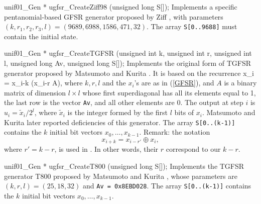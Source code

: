 unif01_Gen * ugfsr_CreateZiff98 (unsigned long S[]);
\endcode
  \tab Implements a specific pentanomial-based GFSR generator proposed 
%
  by Ziff \cite{rZIF98a}, with parameters $(k, r_1, r_2, r_3, l) =
  (9689, 6988, 1586, 471, 32)$.
  The array {\tt S[0..9688]} must contain the initial state.
  \endtab


\code

unif01_Gen * ugfsr_CreateTGFSR (unsigned int k, unsigned int r,
                                unsigned int l, unsigned long Av,
                                unsigned long S[]);
\endcode
  \tab Implements the original form of TGFSR generator proposed by
   Matsumoto and Kurita \cite{rMAT92a}.  It is based on the recurrence
   \eq
      x_i = x_{i-k} \oplus (x_{i-r} A),
   \endeq
   where $k, r, l$ and the $x_i$'s are as in (\ref{GFSR}),
   and $A$ is a binary matrix of dimension $l \times l$ whose first
   superdiagonal has all its elements equal to 1, the last
   row is the vector {\tt Av}, and all other elements are 0.
   The output at step $i$ is $u_i = \tilde x_i/2^l$, where 
   $\tilde x_i$ is the integer formed by the first $l$ bits of $x_i$.
   Matsumoto and Kurita \cite{rMAT94a} later reported deficiencies
   of this generator.   
  The array {\tt S[0..(k-1)]} contains the $k$ initial bit vectors
   $x_0, \dots, x_{k-1}$.
   Remark:  the notation  
     $$ x_{i+k} = x_{i-r'} \oplus x_{i}, $$
   where $r' = k-r$, is used in \cite{rMAT94a}. 
   In other words, their $r$ correspond to our $k-r$.
  \endtab
\code


unif01_Gen * ugfsr_CreateT800 (unsigned long S[]);
\endcode
  \tab Implements the TGFSR generator T800  proposed by
%
   Matsumoto and Kurita \cite{rMAT94a}, whose  parameters are
   $(k,r,l) = (25,18,32)$ and {\tt Av = 0x8EBD028}.
   The array {\tt S[0..(k-1)]} contains the $k$ initial bit vectors
   $x_0, \dots, x_{k-1}$.
  \endtab
\code


